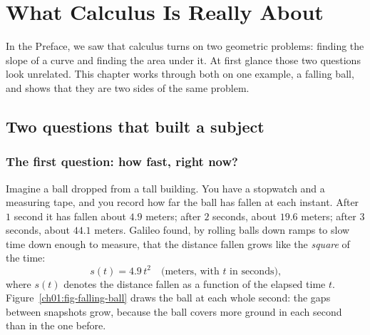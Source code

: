 \chapter{What Calculus Is Really About}

In the Preface, we saw that calculus turns on two geometric problems: finding the slope of a curve and finding the area under it. At first glance those two questions look unrelated. This chapter works through both on one example, a falling ball, and shows that they are two sides of the same problem.

\section{Two questions that built a subject}

\subsection{The first question: how fast, right now?}

Imagine a ball dropped from a tall building. You have a stopwatch and a measuring
tape, and you record how far the ball has fallen at each instant. After $1$
second it has fallen about $4.9$ meters; after $2$ seconds, about $19.6$ meters;
after $3$ seconds, about $44.1$ meters. Galileo found, by rolling balls down ramps to slow time down enough to measure,
that the distance fallen grows like the \emph{square} of the time:
\[
  s(t) = 4.9\,t^2 \quad\text{(meters, with $t$ in seconds),}
\]
where $s(t)$ denotes the distance fallen as a function of the elapsed time $t$.
Figure~\ref{ch01:fig-falling-ball} draws the ball at each whole second: the gaps
between snapshots grow, because the ball covers more ground in each second than
in the one before.

